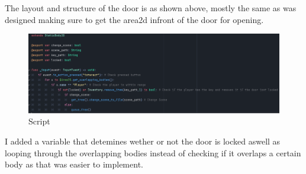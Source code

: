 \documentclass{article}
\begin{document}
        \noindent The layout and structure of the door is as shown above, mostly the same as was designed making sure to get the area2d infront of the door for opening.\\
        \begin{figure}[H]
                \centering
                \includegraphics[width = 0.9\columnwidth]{images/development/Door_script.PNG}
                \caption{Script}
        \end{figure}
        \noindent I added a variable that detemines wether or not the door is locked aswell as looping through the overlapping bodies instead of checking if it overlaps a certain body as that was easier to implement.\\
\end{document}
